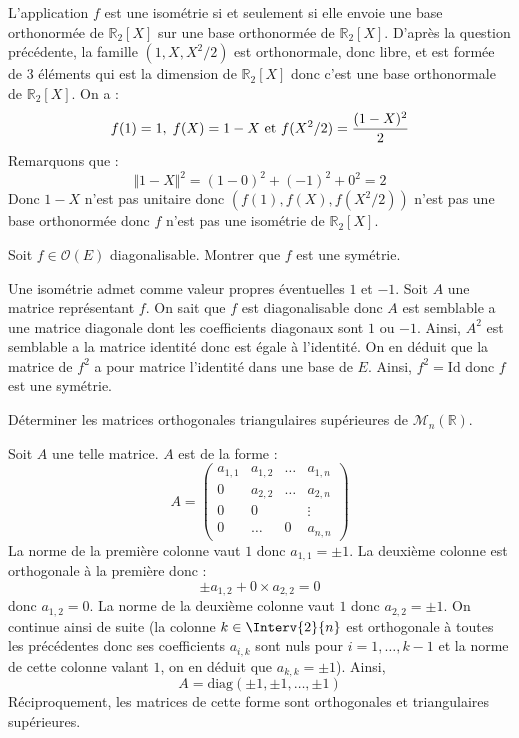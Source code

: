 \documentclass[a4paper,10pt]{report}
\begin{document}
\begin{corr}
\begin{enumerate}
\medskip

\noindent L'application $f$ est une isométrie si et seulement si elle envoie une base orthonormée de $\mathbb{R}_2[X]$ sur une base orthonormée de $\mathbb{R}_2[X]$. D'après la question précédente, la famille $(1,X,X^2/2)$ est orthonormale, donc libre, et est formée de $3$ éléments qui est la dimension de $\mathbb{R}_2[X]$ donc c'est une base orthonormale de $\mathbb{R}_2[X]$. On a :
$$ f(1)=1, \; f(X)=1-X \hbox{ et } f(X^2/2) = \dfrac{(1-X)^2}{2}$$
Remarquons que :
$$ \Vert 1-X \Vert^2 = (1-0)^2 + (-1)^2+ 0^2 = 2$$
Donc $1-X$ n'est pas unitaire donc $(f(1),f(X), f(X^2/2))$ n'est pas une base orthonormée donc $f$ n'est pas une isométrie de  $\mathbb{R}_2[X]$.
\end{enumerate}
\end{corr}

\begin{Exercice}{} Soit $f \in \mathcal{O}(E)$ diagonalisable. Montrer que $f$ est une symétrie.
\end{Exercice} 

\corr Une isométrie admet comme valeur propres éventuelles $1$ et $-1$. Soit $A$ une matrice représentant $f$. On sait que $f$ est diagonalisable donc $A$ est semblable a une matrice diagonale dont les coefficients diagonaux sont $1$ ou $-1$. Ainsi, $A^2$ est semblable a la matrice identité donc est égale à l'identité. On en déduit que la matrice de $f^2$ a pour matrice l'identité dans une base de $E$. Ainsi, $f^2= \textrm{Id}$ donc $f$ est une symétrie.

\begin{Exercice}{} Déterminer les matrices orthogonales triangulaires supérieures de $\mathcal{M}_n(\mathbb{R})$.
\end{Exercice}

\corr Soit $A$ une telle matrice. $A$ est de la forme :
$$ A = \begin{pmatrix}
a_{1,1} & a_{1,2} & \ldots & a_{1,n} \\
0 & a_{2,2} & \ldots & a_{2,n} \\
0 & 0 & & \vdots \\
0 & \ldots & 0 & a_{n,n} \end{pmatrix}$$
La norme de la première colonne vaut $1$ donc $a_{1,1} = \pm 1$. La deuxième colonne est orthogonale à la première donc :
$$ \pm a_{1,2} + 0 \times a_{2,2} = 0$$
donc $a_{1,2}=0$. La norme de la deuxième colonne vaut $1$ donc $a_{2,2} = \pm 1$. On continue ainsi de suite (la colonne $k \in \Interv{2}{n}$ est orthogonale à toutes les précédentes donc ses coefficients $a_{i,k}$ sont nuls pour $i=1, \ldots, k-1$ et la norme de cette colonne valant $1$, on en déduit que $a_{k,k}= \pm 1$). Ainsi,
$$ A= \textrm{diag}(\pm 1, \pm 1, \ldots, \pm 1)$$
Réciproquement, les matrices de cette forme sont orthogonales et triangulaires supérieures.
\end{document}
